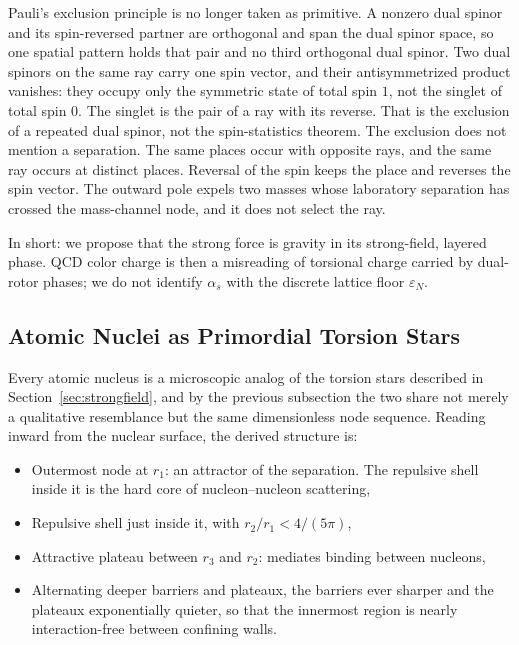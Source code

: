 \documentclass[a4paper]{article}
\begin{document}
Pauli's exclusion principle is no longer taken as primitive. A nonzero dual spinor and its spin-reversed partner are orthogonal and span the dual spinor space, so one spatial pattern holds that pair and no third orthogonal dual spinor. Two dual spinors on the same ray carry one spin vector, and their antisymmetrized product vanishes: they occupy only the symmetric state of total spin $1$, not the singlet of total spin $0$. The singlet is the pair of a ray with its reverse. That is the exclusion of a repeated dual spinor, not the spin-statistics theorem. The exclusion does not mention a separation. The same places occur with opposite rays, and the same ray occurs at distinct places. Reversal of the spin keeps the place and reverses the spin vector. The outward pole expels two masses whose laboratory separation has crossed the mass-channel node, and it does not select the ray.

In short: we propose that the strong force is gravity in its strong-field, layered phase. QCD color charge is then a misreading of torsional charge carried by dual-rotor phases; we do not identify \(\alpha_s\) with the discrete lattice floor \(\varepsilon_N\).

\subsection{Atomic Nuclei as Primordial Torsion Stars}

Every atomic nucleus is a microscopic analog of the torsion stars described in Section~\ref{sec:strongfield}, and by the previous subsection the two share not merely a qualitative resemblance but the same dimensionless node sequence. Reading inward from the nuclear surface, the derived structure is:

\begin{itemize}
\item Outermost node at \(r_1\): an attractor of the separation. The repulsive shell inside it is the hard core of nucleon--nucleon scattering,
\item Repulsive shell just inside it, with \(r_2/r_1<4/(5\pi)\),
\item Attractive plateau between \(r_3\) and \(r_2\): mediates binding between nucleons,
\item Alternating deeper barriers and plateaux, the barriers ever sharper and the plateaux exponentially quieter, so that the innermost region is nearly interaction-free between confining walls.
\end{itemize}
\end{document}
